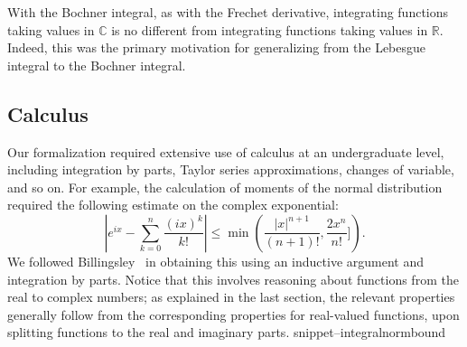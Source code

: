 \documentclass{svjour3}
\newcommand{\RR}{\mathbb{R}}
\newcommand{\CC}{\mathbb{C}}
\newcommand{\Snippet}[1]{\csname snippet--#1\endcsname}
\begin{document}
With the Bochner integral, as with the Frechet derivative, integrating functions taking values in $\CC$ is no different from integrating functions taking values in $\RR$. Indeed, this was the primary motivation for generalizing from the Lebesgue integral to the Bochner integral.

\subsection{Calculus}
\label{subsection:calculus}

Our formalization required extensive use of calculus at an undergraduate level, including integration by parts, Taylor series approximations, changes of variable, and so on. For example, the calculation of moments of the normal distribution required the following estimate on the complex exponential:
\[
 \left| e^{ix} - \sum_{k=0}^n \frac{(ix)^k}{k!} \right| \le \min\left(\frac{|x|^{n+1}}{(n+1)!}, \frac{2 x^n}{n!}]\right).
\]
We followed Billingsley~\cite[Section 26]{billingsley:95} in obtaining this using an inductive argument and integration by parts. Notice that this involves reasoning about functions from the real to complex numbers; as explained in the last section, the relevant properties generally follow from the corresponding properties for real-valued functions, upon splitting functions to the real and imaginary parts. 
\Snippet{integralnormbound}
\end{document}
